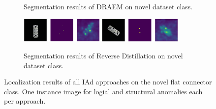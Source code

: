 \begin{figure}[htbp]
\begin{subfigure}[b]{\textwidth}
        \caption{Segmentation results of DRAEM \cite{Zavrtanik_2021DRAEM} on novel dataset class.}
    \end{subfigure}
    \begin{subfigure}[b]{\textwidth}
        \includegraphics[width=0.45\textwidth]{figures/allapproachesFCimages/RevDist_structural_26.png}
        \includegraphics[width=0.45\textwidth]{figures/allapproachesFCimages/RevDist_logical_016.png}
        \caption{Segmentation results of Reverse Distillation \cite{revdist2023} on novel dataset class.}

    \end{subfigure}
    \caption{Localization results of all IAd approaches on the novel flat connector class. One instance image for logial and structural anomalies each per approach.}
    \label{fig:FCallapproaches}
\end{figure}